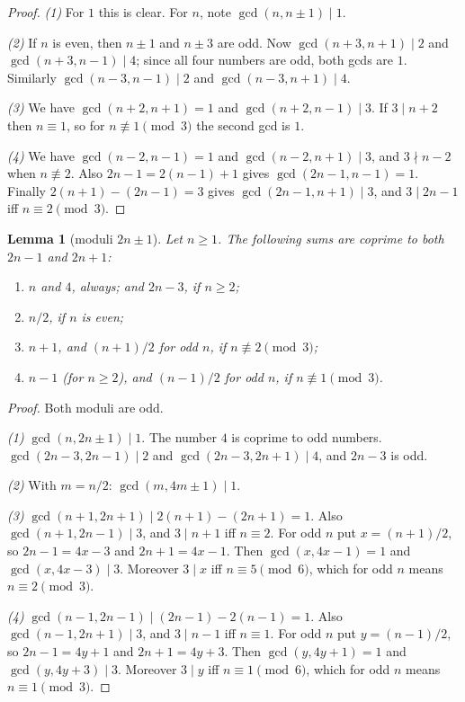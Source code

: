 \documentclass[11pt]{article}
\numberwithin{equation}{section}
\newtheorem{lemma}[theorem]{Lemma}
\theoremstyle{definition}
\theoremstyle{remark}
\begin{document}
\begin{proof}
\emph{(1)} For $1$ this is clear. For $n$, note $\gcd(n,n\pm1)\mid 1$.

\emph{(2)} If $n$ is even, then $n\pm1$ and $n\pm3$ are odd. Now $\gcd(n+3,n+1)\mid 2$ and
$\gcd(n+3,n-1)\mid4$; since all four numbers are odd, both gcds are $1$. Similarly
$\gcd(n-3,n-1)\mid2$ and $\gcd(n-3,n+1)\mid 4$.

\emph{(3)} We have $\gcd(n+2,n+1)=1$ and $\gcd(n+2,n-1)\mid 3$. If $3\mid n+2$ then $n\equiv1$, so for
$n\not\equiv1\pmod3$ the second gcd is $1$.

\emph{(4)} We have $\gcd(n-2,n-1)=1$ and $\gcd(n-2,n+1)\mid3$, and $3\nmid n-2$ when
$n\not\equiv2$. Also $2n-1=2(n-1)+1$ gives $\gcd(2n-1,n-1)=1$. Finally $2(n+1)-(2n-1)=3$ gives
$\gcd(2n-1,n+1)\mid3$, and $3\mid 2n-1$ iff $n\equiv2\pmod 3$.
\end{proof}

\begin{lemma}[moduli $2n\pm1$]\label{lem:adm2}
Let $n\ge1$. The following sums are coprime to both $2n-1$ and $2n+1$:
\begin{enumerate}
  \item $n$ and $4$, always; and $2n-3$, if $n\ge2$;
  \item $n/2$, if $n$ is even;
  \item $n+1$, and $(n+1)/2$ for odd $n$, if $n\not\equiv2\pmod3$;
  \item $n-1$ (for $n\ge2$), and $(n-1)/2$ for odd $n$, if $n\not\equiv1\pmod 3$.
\end{enumerate}
\end{lemma}

\begin{proof}
Both moduli are odd.

\emph{(1)} $\gcd(n,2n\pm1)\mid 1$. The number $4$ is coprime to odd numbers.
$\gcd(2n-3,2n-1)\mid2$ and $\gcd(2n-3,2n+1)\mid 4$, and $2n-3$ is odd.

\emph{(2)} With $m=n/2$: $\gcd(m,4m\pm1)\mid1$.

\emph{(3)} $\gcd(n+1,2n+1)\mid 2(n+1)-(2n+1)=1$. Also $\gcd(n+1,2n-1)\mid 3$, and $3\mid n+1$ iff
$n\equiv2$. For odd $n$ put $x=(n+1)/2$, so $2n-1=4x-3$ and $2n+1=4x-1$. Then $\gcd(x,4x-1)=1$ and
$\gcd(x,4x-3)\mid3$. Moreover $3\mid x$ iff $n\equiv5\pmod 6$, which for odd $n$ means
$n\equiv2\pmod3$.

\emph{(4)} $\gcd(n-1,2n-1)\mid (2n-1)-2(n-1)=1$. Also $\gcd(n-1,2n+1)\mid3$, and $3\mid n-1$ iff
$n\equiv1$. For odd $n$ put $y=(n-1)/2$, so $2n-1=4y+1$ and $2n+1=4y+3$. Then $\gcd(y,4y+1)=1$ and
$\gcd(y,4y+3)\mid3$. Moreover $3\mid y$ iff $n\equiv1\pmod6$, which for odd $n$ means
$n\equiv1\pmod 3$.
\end{proof}
\end{document}
